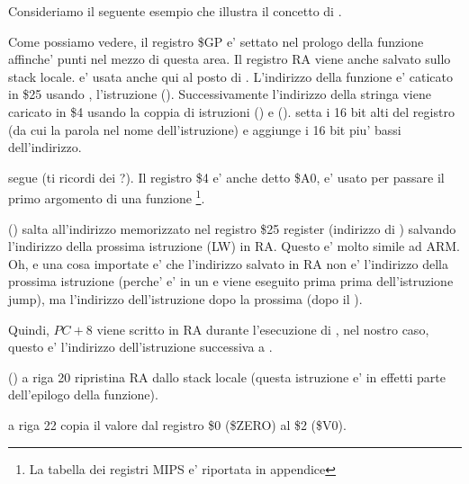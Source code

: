 Consideriamo il seguente esempio che illustra il concetto di .



Come possiamo vedere, il registro \$GP e' settato nel prologo della funzione affinche' punti nel mezzo di questa area.
Il registro \ac{RA} viene anche salvato sullo stack locale.
\puts e' usata anche qui al posto di \printf.
L'indirizzo della funzione \puts e' caticato in \$25 usando  , l'istruzione ().
Successivamente l'indirizzo della stringa viene caricato in \$4 usando la coppia di istruzioni  () e 
 ().
 setta i 16 bit alti del registro (da cui la parola  nel nome dell'istruzione) e  aggiunge
i 16 bit piu' bassi dell'indirizzo.

 segue  (ti ricordi dei ?).
Il registro \$4 e' anche detto \$A0, e' usato per passare il primo argomento di una funzione
\footnote{La tabella dei registri MIPS e' riportata in appendice }.


 () salta all'indirizzo memorizzato nel registro \$25 register (indirizzo di \puts) 
salvando l'indirizzo della prossima istruzione (LW) in \ac{RA}.
Questo e' molto simile ad ARM.
Oh, e una cosa importate e' che l'indirizzo salvato in \ac{RA} non e' l'indirizzo della prossima istruzione (perche' e' in un 
 e viene eseguito prima prima dell'istruzione jump),
ma l'indirizzo dell'istruzione dopo la prossima (dopo il ).

Quindi, $PC + 8$ viene scritto in \ac{RA} durante l'esecuzione di , nel nostro caso, questo e' l'indirizzo dell'istruzione 
 successiva a .

 () a riga 20 ripristina \ac{RA} dallo stack locale (questa istruzione e' in effetti parte
dell'epilogo della funzione).


 a riga 22 copia il valore dal registro \$0 (\$ZERO) al \$2 (\$V0).
\label{MIPS_zero_register}


